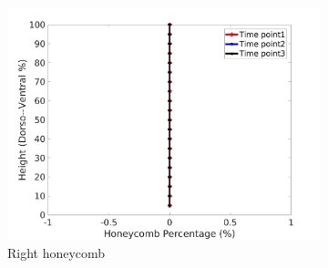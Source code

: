 \begin{figure}[H]
\begin{subfigure}{.42\linewidth}
  \includegraphics[width=\linewidth,trim={{.0\wd0} {.0\wd0} {.0\wd0} {.0\wd0}},clip]{Appendix/Image_AppexA/DorsoToVentral/IPF9RightLungHoneycombDiseaseDorsoToVentral.jpg}
  \caption{Right honeycomb}
  \label{fig:IPF9DiseaseDorsoToVentral-f}
\end{subfigure}
\begin{subfigure}{.42\linewidth}%

\end{subfigure}
\end{figure}
